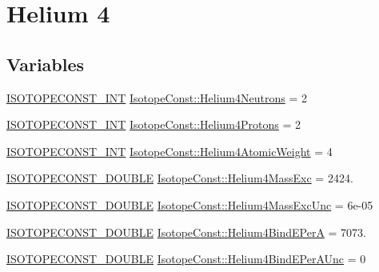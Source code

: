 \hypertarget{group___isotope_const-_helium-_he4}{}\section{Helium 4}
\label{group___isotope_const-_helium-_he4}
\subsection*{Variables}
\begin{DoxyCompactItemize}
\item 
\mbox{\hyperlink{group___isotope_const-_macros_ga5f18360b3e99483a35c32d789e62621c}{I\+S\+O\+T\+O\+P\+E\+C\+O\+N\+S\+T\+\_\+\+I\+NT}} \mbox{\hyperlink{group___isotope_const-_helium-_he4_ga3d7d61d527d6507cfa25400872d7c33b}{Isotope\+Const\+::\+Helium4\+Neutrons}} = 2
\item 
\mbox{\hyperlink{group___isotope_const-_macros_ga5f18360b3e99483a35c32d789e62621c}{I\+S\+O\+T\+O\+P\+E\+C\+O\+N\+S\+T\+\_\+\+I\+NT}} \mbox{\hyperlink{group___isotope_const-_helium-_he4_gaa858d2d34272e97582deb4432666a209}{Isotope\+Const\+::\+Helium4\+Protons}} = 2
\item 
\mbox{\hyperlink{group___isotope_const-_macros_ga5f18360b3e99483a35c32d789e62621c}{I\+S\+O\+T\+O\+P\+E\+C\+O\+N\+S\+T\+\_\+\+I\+NT}} \mbox{\hyperlink{group___isotope_const-_helium-_he4_ga89644480de79668a374268ae5ed1db8e}{Isotope\+Const\+::\+Helium4\+Atomic\+Weight}} = 4
\item 
\mbox{\hyperlink{group___isotope_const-_macros_ga8f45a7272ce02c0b4c65c44636ed719a}{I\+S\+O\+T\+O\+P\+E\+C\+O\+N\+S\+T\+\_\+\+D\+O\+U\+B\+LE}} \mbox{\hyperlink{group___isotope_const-_helium-_he4_gac9eb60ba4c3e14577336a04d7b0061c7}{Isotope\+Const\+::\+Helium4\+Mass\+Exc}} = 2424.
\item 
\mbox{\hyperlink{group___isotope_const-_macros_ga8f45a7272ce02c0b4c65c44636ed719a}{I\+S\+O\+T\+O\+P\+E\+C\+O\+N\+S\+T\+\_\+\+D\+O\+U\+B\+LE}} \mbox{\hyperlink{group___isotope_const-_helium-_he4_ga459fd7bd689b5ac6b1c115b3844b88cb}{Isotope\+Const\+::\+Helium4\+Mass\+Exc\+Unc}} = 6e-\/05
\item 
\mbox{\hyperlink{group___isotope_const-_macros_ga8f45a7272ce02c0b4c65c44636ed719a}{I\+S\+O\+T\+O\+P\+E\+C\+O\+N\+S\+T\+\_\+\+D\+O\+U\+B\+LE}} \mbox{\hyperlink{group___isotope_const-_helium-_he4_ga97b6e9b8093bb1dc55cb1df0d0bbe96f}{Isotope\+Const\+::\+Helium4\+Bind\+E\+PerA}} = 7073.
\item 
\mbox{\hyperlink{group___isotope_const-_macros_ga8f45a7272ce02c0b4c65c44636ed719a}{I\+S\+O\+T\+O\+P\+E\+C\+O\+N\+S\+T\+\_\+\+D\+O\+U\+B\+LE}} \mbox{\hyperlink{group___isotope_const-_helium-_he4_ga826c1357275b2e91d6938b4b5f83e5d9}{Isotope\+Const\+::\+Helium4\+Bind\+E\+Per\+A\+Unc}} = 0

\end{DoxyCompactItemize}
